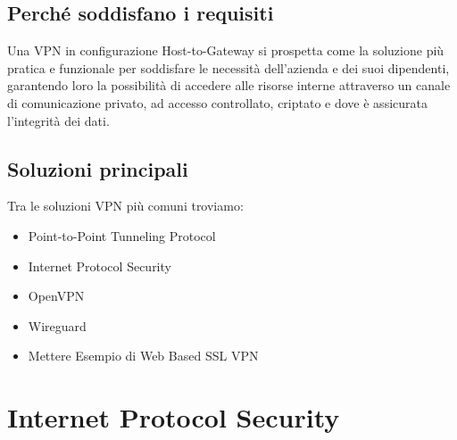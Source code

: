 \subsection{Perché soddisfano i requisiti}
Una VPN in configurazione Host-to-Gateway si prospetta come la soluzione più pratica e funzionale per soddisfare le necessità dell'azienda e dei suoi dipendenti, garantendo loro la possibilità di accedere alle risorse interne attraverso un canale di comunicazione privato, ad accesso controllato, criptato e dove è assicurata l'integrità dei dati.

\subsection{Soluzioni principali}
Tra le soluzioni VPN più comuni troviamo:
\begin{itemize}
    \item Point-to-Point Tunneling Protocol
    \item Internet Protocol Security
    \item OpenVPN
    \item Wireguard
    \item Mettere Esempio di Web Based SSL VPN %
\end{itemize}




\section{Internet Protocol Security}
